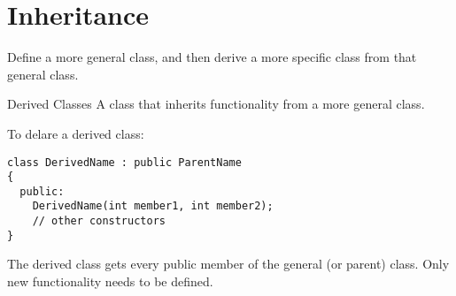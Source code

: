 \documentclass[\main/notes.tex]{subfiles}
\begin{document}
		\section{Inheritance}
			Define a more general class, and then derive a more specific class from that general class.
			\begin{definition}{Derived Classes}
				A class that inherits functionality from a more general class.

				\noindent To delare a derived class:
				\begin{verbatim}
class DerivedName : public ParentName
{
  public:
    DerivedName(int member1, int member2);
    // other constructors
}
				\end{verbatim}
				The derived class gets every public member of the general (or parent) class. Only new functionality needs to be defined.
			\end{definition}

\end{document}
